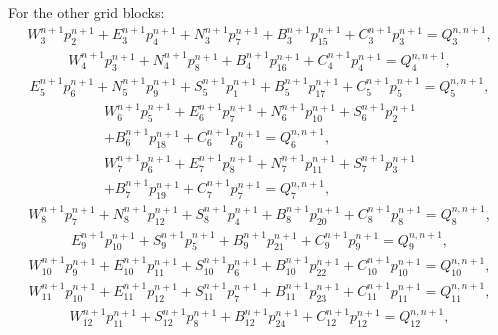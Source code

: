 For the other grid blocks:
\begin{multline}
\label{solution4}
W^{n+1}_{3}p^{n+1}_{2}+E^{n+1}_{3}p^{n+1}_{4}+N^{n+1}_{3}p^{n+1}_{7}+B^{n+1}_{3}p^{n+1}_{15}+C^{n+1}_{3}p^{n+1}_{3}=Q^{n, n+1}_{3},
\end{multline}
\begin{multline}
\label{solution5}
W^{n+1}_{4}p^{n+1}_{3}+N^{n+1}_{4}p^{n+1}_{8}+B^{n+1}_{4}p^{n+1}_{16}+C^{n+1}_{4}p^{n+1}_{4}=Q^{n, n+1}_{4},
\end{multline}
\begin{multline}
\label{solution6}
E^{n+1}_{5}p^{n+1}_{6}+N^{n+1}_{5}p^{n+1}_{9}+S^{n+1}_{5}p^{n+1}_{1}+B^{n+1}_{5}p^{n+1}_{17}+C^{n+1}_{5}p^{n+1}_{5}=Q^{n, n+1}_{5},
\end{multline}
\begin{multline}
\label{solution7}
W^{n+1}_{6}p^{n+1}_{5}+E^{n+1}_{6}p^{n+1}_{7}+N^{n+1}_{6}p^{n+1}_{10}+S^{n+1}_{6}p^{n+1}_{2}\\+B^{n+1}_{6}p^{n+1}_{18}+C^{n+1}_{6}p^{n+1}_{6}=Q^{n, n+1}_{6},
\end{multline}
\begin{multline}
\label{solution8}
W^{n+1}_{7}p^{n+1}_{6}+E^{n+1}_{7}p^{n+1}_{8}+N^{n+1}_{7}p^{n+1}_{11}+S^{n+1}_{7}p^{n+1}_{3}\\+B^{n+1}_{7}p^{n+1}_{19}+C^{n+1}_{7}p^{n+1}_{7}=Q^{n, n+1}_{7},
\end{multline}
\begin{multline}
\label{solution9}
W^{n+1}_{8}p^{n+1}_{7}+N^{n+1}_{8}p^{n+1}_{12}+S^{n+1}_{8}p^{n+1}_{4}+B^{n+1}_{8}p^{n+1}_{20}+C^{n+1}_{8}p^{n+1}_{8}=Q^{n, n+1}_{8},
\end{multline}
\begin{multline}
\label{solution10}
E^{n+1}_{9}p^{n+1}_{10}+S^{n+1}_{9}p^{n+1}_{5}+B^{n+1}_{9}p^{n+1}_{21}+C^{n+1}_{9}p^{n+1}_{9}=Q^{n, n+1}_{9},
\end{multline}
\begin{multline}
\label{solution11}
W^{n+1}_{10}p^{n+1}_{9}+E^{n+1}_{10}p^{n+1}_{11}+S^{n+1}_{10}p^{n+1}_{6}+B^{n+1}_{10}p^{n+1}_{22}+C^{n+1}_{10}p^{n+1}_{10}=Q^{n, n+1}_{10},
\end{multline}
\begin{multline}
\label{solution12}
W^{n+1}_{11}p^{n+1}_{10}+E^{n+1}_{11}p^{n+1}_{12}+S^{n+1}_{11}p^{n+1}_{7}+B^{n+1}_{11}p^{n+1}_{23}+C^{n+1}_{11}p^{n+1}_{11}=Q^{n, n+1}_{11},
\end{multline}
\begin{multline}
\label{solution13}
W^{n+1}_{12}p^{n+1}_{11}+S^{n+1}_{12}p^{n+1}_{8}+B^{n+1}_{12}p^{n+1}_{24}+C^{n+1}_{12}p^{n+1}_{12}=Q^{n, n+1}_{12},
\end{multline}
